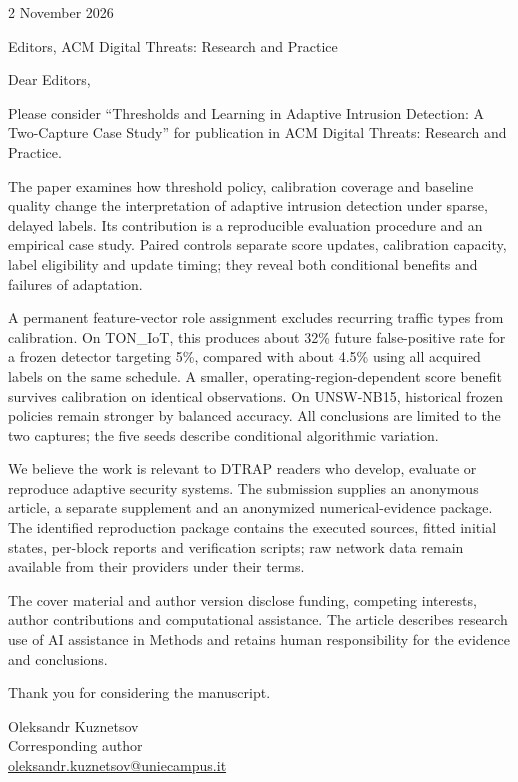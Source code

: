 \documentclass[11pt]{article}
\begin{document}
\begin{flushright}2 November 2026\end{flushright}
Editors, ACM Digital Threats: Research and Practice

Dear Editors,

Please consider ``Thresholds and Learning in Adaptive Intrusion Detection: A Two-Capture Case Study'' for publication in ACM Digital Threats: Research and Practice.

The paper examines how threshold policy, calibration coverage and baseline quality change the interpretation of adaptive intrusion detection under sparse, delayed labels. Its contribution is a reproducible evaluation procedure and an empirical case study. Paired controls separate score updates, calibration capacity, label eligibility and update timing; they reveal both conditional benefits and failures of adaptation.

A permanent feature-vector role assignment excludes recurring traffic types from calibration. On TON\_IoT, this produces about 32\% future false-positive rate for a frozen detector targeting 5\%, compared with about 4.5\% using all acquired labels on the same schedule. A smaller, operating-region-dependent score benefit survives calibration on identical observations. On UNSW-NB15, historical frozen policies remain stronger by balanced accuracy. All conclusions are limited to the two captures; the five seeds describe conditional algorithmic variation.

We believe the work is relevant to DTRAP readers who develop, evaluate or reproduce adaptive security systems. The submission supplies an anonymous article, a separate supplement and an anonymized numerical-evidence package. The identified reproduction package contains the executed sources, fitted initial states, per-block reports and verification scripts; raw network data remain available from their providers under their terms.

The cover material and author version disclose funding, competing interests, author contributions and computational assistance. The article describes research use of AI assistance in Methods and retains human responsibility for the evidence and conclusions.

Thank you for considering the manuscript.

Oleksandr Kuznetsov\\
Corresponding author\\
\href{mailto:oleksandr.kuznetsov@uniecampus.it}{oleksandr.kuznetsov@uniecampus.it}
\end{document}
